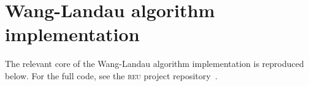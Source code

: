 \documentclass[aps,reprint]{revtex4-2}
\theoremstyle{plain}
\theoremstyle{definition}
\begin{document}
\section{Wang-Landau algorithm implementation}\label{sec:wanglandau-core}

The relevant core of the Wang-Landau algorithm implementation is reproduced
below. For the full code, see the \textsc{reu} project
repository~\cite{rpi-reu-notebook}.

\inputminted{python}{wanglandau-core.py}

\nocite{*}
\hypersetup{urlcolor=Mahogany}

\end{document}
